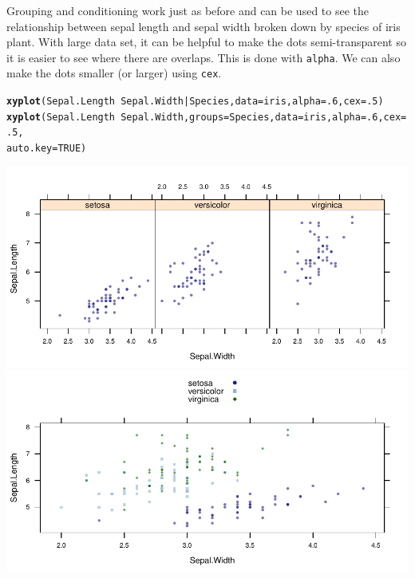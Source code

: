 \documentclass[twoside]{book}\usepackage[]{graphicx}\usepackage[]{xcolor}
\makeatletter
\def\maxwidth{ %
  \ifdim\Gin@nat@width>\linewidth
    \linewidth
  \else
    \Gin@nat@width
  \fi
}
\newcommand{\hlnum}[1]{\textcolor[rgb]{0.686,0.059,0.569}{#1}}%
\newcommand{\hlopt}[1]{\textcolor[rgb]{0,0,0}{#1}}%
\newcommand{\hlstd}[1]{\textcolor[rgb]{0.345,0.345,0.345}{#1}}%
\newcommand{\hlkwc}[1]{\textcolor[rgb]{0.333,0.667,0.333}{#1}}%
\newcommand{\hlkwd}[1]{\textcolor[rgb]{0.737,0.353,0.396}{\textbf{#1}}}%
\newenvironment{kframe}{%
 \def\at@end@of@kframe{}%
 \ifinner\ifhmode%
  \def\at@end@of@kframe{\end{minipage}}%
  \begin{minipage}{\columnwidth}%
 \fi\fi%
 \def\FrameCommand##1{\hskip\@totalleftmargin \hskip-\fboxsep
 \colorbox{shadecolor}{##1}\hskip-\fboxsep
     \hskip-\linewidth \hskip-\@totalleftmargin \hskip\columnwidth}%
 \MakeFramed {\advance\hsize-\width
   \@totalleftmargin\z@ \linewidth\hsize
   \@setminipage}}%
 {\par\unskip\endMakeFramed%
 \at@end@of@kframe}
\newenvironment{knitrout}{}{} %
\newcommand{\argument}[1]{{\color{brown!80!black}\texttt{#1}}}
\makeatother
\begin{document}
Grouping and conditioning work just as before and can be used to see the relationship
between sepal length and sepal width broken down by species of iris plant.
With large data set, it can be helpful to make the dots semi-transparent so it is
easier to see where there are overlaps.  This is done with \argument{alpha}.
We can also make the dots smaller (or larger) using \argument{cex}.
\begin{knitrout}
\color{fgcolor}\begin{kframe}
\begin{alltt}
\hlkwd{xyplot}\hlstd{( Sepal.Length} \hlopt{~} \hlstd{Sepal.Width} \hlopt{|} \hlstd{Species,} \hlkwc{data}\hlstd{=iris,} \hlkwc{alpha}\hlstd{=}\hlnum{.6}\hlstd{,} \hlkwc{cex}\hlstd{=}\hlnum{.5} \hlstd{)}
\hlkwd{xyplot}\hlstd{( Sepal.Length} \hlopt{~} \hlstd{Sepal.Width,} \hlkwc{groups} \hlstd{= Species,} \hlkwc{data}\hlstd{=iris,} \hlkwc{alpha}\hlstd{=}\hlnum{.6}\hlstd{,} \hlkwc{cex}\hlstd{=}\hlnum{.5}\hlstd{,}
           \hlkwc{auto.key}\hlstd{=}\hlnum{TRUE} \hlstd{)}
\end{alltt}
\end{kframe}

{\centering \includegraphics[width=\maxwidth]{figures/fig-xyplot2-1} 
\includegraphics[width=\maxwidth]{figures/fig-xyplot2-2} 

}



\end{knitrout}
\end{document}
